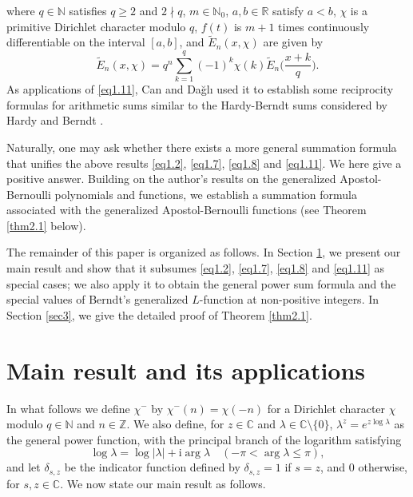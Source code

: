 \documentclass[reqno]{amsart}
\numberwithin{equation}{section}
\begin{document}
where $q\in\mathbb{N}$ satisfies $q\geqslant2$ and $2\nmid q$, $m\in\mathbb{N}_{0}$, $a,b\in\mathbb{R}$ satisfy $a<b$, $\chi$ is a primitive Dirichlet character modulo $q$, $f(t)$ is $m+1$
times continuously differentiable on the interval $[a,b]$, and $\widetilde{E}_{n}(x,\chi)$ are given by
\begin{equation*}
\widetilde{E}_{n}(x,\chi)=q^{n}\sum_{k=1}^{q}(-1)^{k}\chi(k)\widetilde{E}_{n}\biggl(\frac{x+k}{q}\biggl).
\end{equation*}
As applications of \eqref{eq1.11}, Can and Da\u{g}l{\i} \cite[Theorems 1.5 and 1.6]{can} used it to establish some reciprocity formulas for arithmetic sums similar to the Hardy-Berndt sums considered by Hardy \cite{hardy1} and Berndt \cite{berndt4}.

Naturally, one may ask whether there exists a more general summation formula that unifies the above results \eqref{eq1.2}, \eqref{eq1.7}, \eqref{eq1.8} and \eqref{eq1.11}. We here give a positive answer. Building on the author's results \cite{he} on the generalized Apostol-Bernoulli polynomials and functions, we establish a summation formula associated with the generalized Apostol-Bernoulli functions (see Theorem \ref{thm2.1} below).

The remainder of this paper is organized as follows. In Section \ref{sec2}, we present our main result and show that it subsumes \eqref{eq1.2}, \eqref{eq1.7}, \eqref{eq1.8} and \eqref{eq1.11} as special cases; we also apply it to obtain the general power sum formula and the special values of Berndt's generalized $L$-function at non-positive integers. In Section \ref{sec3}, we give the detailed proof of Theorem \ref{thm2.1}.

\section{Main result and its applications}\label{sec2}

In what follows we define $\chi^{-}$ by $\chi^{-}(n)=\chi(-n)$ for a Dirichlet character $\chi$ modulo $q\in\mathbb{N}$ and $n\in\mathbb{Z}$. We also define, for $z\in\mathbb{C}$ and $\lambda\in\mathbb{C}\setminus\{0\}$, $\lambda^{z}=e^{z\log\lambda}$ as the general power function, with the principal branch of the logarithm satisfying
\begin{equation*}
\log \lambda=\log|\lambda|+\mathrm{i}\arg \lambda \quad( -\pi<\arg \lambda\leqslant\pi),
\end{equation*}
and let $\delta_{s,z}$ be the indicator function defined by $\delta_{s,z}=1$ if $s=z$, and $0$ otherwise, for $s,z\in\mathbb{C}$. We now state our main result as follows.
\end{document}

